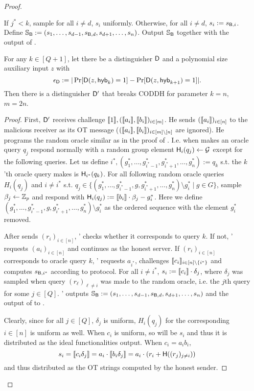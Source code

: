 \begin{proof}
\begin{description}
If $j^*<k$, sample for all $i\neq d$, $s_i$ uniformly. Otherwise, for all $i\neq d$, $s_i:=s_{\mathsf{B},i}$.   Define $\mathsf{\mathbb S}_{\mathsf{B}}:=(s_{1},\dots, s_{d-1},s_{\mathsf{B},d},s_{d+1},\dots, s_{n})$.  
Output $\mathsf{\mathbb S}_{\mathsf{B}}$ together with the output of \Adv. 
\end{description}

\begin{claim}
For any $k\in[Q+1]$, let there be a distinguisher $\mathsf D$ and a polynomial size auxiliary input $z$ with
$$
\epsilon_{\mathsf D}:=|\Pr[\mathsf D(z,\mathsf{hyb}_{k})=1] -\Pr[\mathsf D(z,\mathsf{hyb}_{k+1})=1]|.
$$
Then there is a distinguisher $\mathsf D'$ that breaks CODDH for parameter $k=n$, $m=2n$.
\end{claim}

\begin{proof}
First, $\mathsf D'$ receives challenge $\llbracket 1\rrbracket, (\llbracket a_i\rrbracket,\llbracket b_i\rrbracket)_{i\in [m]}$. He sends $(\llbracket a_i\rrbracket)_{i\in [n]}$ to the malicious receiver as its OT message ($(\llbracket a_i\rrbracket,\llbracket b_i\rrbracket)_{i\in [m]\setminus [n]}$ are ignored). He programs the random oracle similar as in the proof of . I.e. when \Adv makes an oracle query $q_{j}$ respond normally with a random group element $\mathsf{H}_i(q_{j})\leftarrow\mathcal{G}$ except for the following queries. Let us define $i^*, (g^*_1,\dots, g^*_{i^*-1},g^*_{i^*+1},\dots, g^*_{n}):=q_k$ s.t. the $k$'th oracle query \Adv makes is $\mathsf{H}_{i^*}(q_{k})$. 
For all following random oracle queries $H_i(q_j)$ and $i\neq i^*$ s.t. $q_j\in \{ (g^*_1,\dots, g^*_{i^*-1}, g,g^*_{i^*+1},\dots, g^*_{n}) \setminus g^*_i \mid g\in G \}$, sample $\beta_j\leftarrow \mathbb Z_p$ and respond with $\mathsf{H}_i(q_j):=\llbracket b_i\rrbracket\cdot \beta_j - g^*_{i}$. Here we define $(g^*_1,\dots, g^*_{i^*-1}, g,g^*_{i^*+1},\dots, g^*_{n}) \setminus g^*_i$ as the ordered sequence with the element $g^*_i$ removed.

After \A sends $(r_i)_{i\in[n]}$, \D' checks whether it corresponds to query $k$. If not, \D' requests $(a_i)_{i\in [n]}$ and continues as the honest server. If $(r_i)_{i\in[n]}$ corresponds to oracle query $k$, \D' requests $a_{i^*}$, challenges $\llbracket  c_i\rrbracket_{i\in[n]\setminus\{i^*\}}$ and computes $s_{\mathsf{B},i^*}$ according to protocol. For all $i\neq i^*$, $s_{i}:=\llbracket  c_i\rrbracket \cdot \delta_j$, where $\delta_j$ was sampled when query $(r_\ell)_{\ell\neq i}$ was made to the random oracle, i.e. the $j$th query for some $j\in[Q]$. \D' outputs $\mathsf{\mathbb S}_{\mathsf{B}}:=(s_{1},\dots, s_{d-1},s_{\mathsf{B},d},s_{d+1},\dots, s_{n})$ and the output of \A to \D.

Clearly, since for all $j\in[Q]$, $\delta_j$ is uniform, $H_i(q_j)$ for the corresponding $i\in[n]$ is uniform as well. When $c_i$ is uniform, so will be $s_i$ and thus it is distributed as the ideal functionalities output. When $c_i=a_ib_i$, 
$$
s_i=\llbracket c_i \delta_j\rrbracket=a_i\cdot\llbracket b_i \delta_j\rrbracket=a_i\cdot (r_i+\mathsf{H}((r_j)_{j\neq i}))
$$ 
and thus distributed as the OT strings computed by the honest sender.
\pe
\end{proof}


\end{proof}
